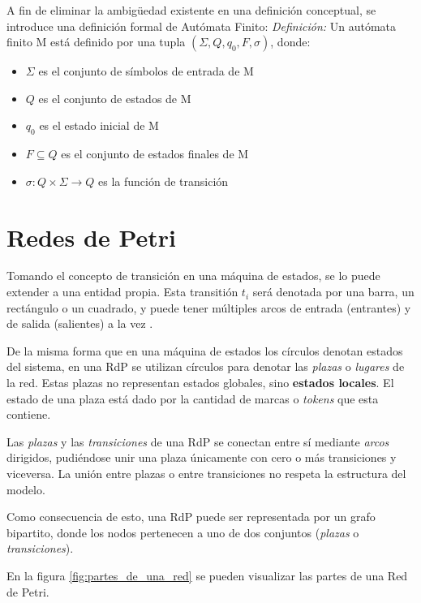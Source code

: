 A fin de eliminar la ambigüedad existente en una definición conceptual, se
introduce una definición formal de Autómata Finito:
\newline\newline\emph{Definición:} Un autómata finito M está definido por una
tupla $(\Sigma, Q, q_{0}, F, \sigma)$, donde:
\begin{itemize}    
  \item $\Sigma$ es el conjunto de símbolos de entrada de M
  \item $Q$ es el conjunto de estados de M
  \item $q_{0}$ es el estado inicial de M
  \item $F \subseteq Q$ es el conjunto de estados finales de M
  \item $\sigma : Q  \times \Sigma \rightarrow Q$ es la función de
  transición
\end{itemize} \cite{FSM_Wright}

\section{Redes de Petri}
\label{redes_de_petri}

Tomando el concepto de transición en una máquina de estados, se lo puede
extender a una entidad propia.
Esta transitión $t_{i}$ será denotada por una barra, un rectángulo o un
cuadrado, y puede tener múltiples arcos de entrada (entrantes) y de salida
(salientes) a la vez \cite{PetriNetsFundamentals}.

De la misma forma que en una máquina de estados los círculos denotan estados
del sistema, en una RdP se utilizan círculos para denotar las \textit{plazas} o
\textit{lugares} de la red. Estas plazas no representan estados globales, sino
\textbf{estados locales}. \cite{PetriNetsFundamentals} El estado de una plaza
está dado por la cantidad de marcas o \textit{tokens} que esta contiene.

Las \textit{plazas} y las \textit{transiciones} de una RdP se conectan entre sí
mediante \textit{arcos} dirigidos, pudiéndose unir una plaza únicamente con cero
o más transiciones y viceversa. La unión entre plazas o entre transiciones no
respeta la estructura del modelo.

Como consecuencia de esto, una RdP puede ser representada por un grafo
bipartito, donde los nodos pertenecen a uno de dos conjuntos (\textit{plazas} o
\textit{transiciones}).

En la figura \ref{fig:partes_de_una_red} se pueden visualizar las partes de una
Red de Petri.

